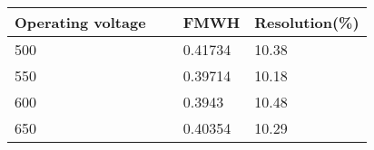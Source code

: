 \begin{table}[H]
    \centering
    \begin{tabular}{|l|l|l|l|}
    \hline
        Operating voltage & ~ & FMWH & Resolution(\%) \\ \hline
        500 & ~ & 0.41734 & 10.38 \\ \hline
        550 & ~ & 0.39714 & 10.18 \\ \hline
        600 & ~ & 0.3943 & 10.48 \\ \hline
        650 & ~ & 0.40354 & 10.29 \\ \hline
    \end{tabular}
\end{table}